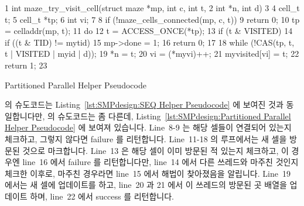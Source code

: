 \begin{listing}[tbp]
{ \scriptsize
\begin{verbbox}
  1 int maze_try_visit_cell(struct maze *mp, int c, int t,
  2       int *n, int d)
  3 {
  4   cell_t t;
  5   cell_t *tp;
  6   int vi;
  7 
  8   if (!maze_cells_connected(mp, c, t))
  9     return 0;
 10   tp = celladdr(mp, t);
 11   do {
 12     t = ACCESS_ONCE(*tp);
 13     if (t & VISITED) {
 14       if ((t & TID) != mytid)
 15         mp->done = 1;
 16       return 0;
 17     }
 18   } while (!CAS(tp, t, t | VISITED | myid | d));
 19   *n = t;
 20   vi = (*myvi)++;
 21   myvisited[vi] = t;
 22   return 1;
 23 }
\end{verbbox}
}
\centering
\theverbbox
\caption{Partitioned Parallel Helper Pseudocode}
\label{lst:SMPdesign:Partitioned Parallel Helper Pseudocode}
\end{listing}

 의 슈도코드는
Listing~\ref{lst:SMPdesign:SEQ Helper Pseudocode} 에 보여진 것과 동일합니다만,
 의 슈도코드는 좀 다른데,
Listing~\ref{lst:SMPdesign:Partitioned Parallel Helper Pseudocode} 에 보여져
있습니다.
Line~8-9 는 해당 셀들이 연결되어 있는지 체크하고, 그렇지 않다면 failure 를
리턴합니다.
Line~11-18 의 루프에서는 새 셀을 방문된 것으로 마크합니다.
Line~13 은 해당 셀이 이미 방문된 적 있는지 체크하고, 이 경우엔 line~16 에서
failure 를 리턴합니다만, line~14 에서 다른 쓰레드와 마주친 것인지 체크한
이후로, 마주친 경우라면 line~15 에서 해법이 찾아졌음을 알립니다.
Line~19 에서는 새 셀에 업데이트를 하고, line~20 과 21 에서 이 쓰레드의 방문된
곳 배열을 업데이트 하며, line~22 에서 success 를 리턴합니다.

